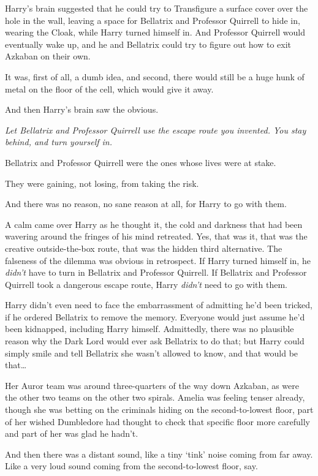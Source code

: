Harry’s brain suggested that he could try to Transfigure a surface cover over the hole in the wall, leaving a space for Bellatrix and Professor Quirrell to hide in, wearing the Cloak, while Harry turned himself in. And Professor Quirrell would eventually wake up, and he and Bellatrix could try to figure out how to exit Azkaban on their own.

It was, first of all, a dumb idea, and second, there would still be a huge hunk of metal on the floor of the cell, which would give it away.

And then Harry’s brain saw the obvious.

\emph{Let Bellatrix and Professor Quirrell use the escape route you invented. You stay behind, and turn yourself in.}

Bellatrix and Professor Quirrell were the ones whose lives were at stake.

They were gaining, not losing, from taking the risk.

And there was no reason, no sane reason at all, for Harry to go with them.

A calm came over Harry as he thought it, the cold and darkness that had been wavering around the fringes of his mind retreated. Yes, that was it, that was the creative outside-the-box route, that was the hidden third alternative. The falseness of the dilemma was obvious in retrospect. If Harry turned himself in, he \emph{didn’t} have to turn in Bellatrix and Professor Quirrell. If Bellatrix and Professor Quirrell took a dangerous escape route, Harry \emph{didn’t} need to go with them.

Harry didn’t even need to face the embarrassment of admitting he’d been tricked, if he ordered Bellatrix to remove the memory. Everyone would just assume he’d been kidnapped, including Harry himself. Admittedly, there was no plausible reason why the Dark Lord would ever ask Bellatrix to do that; but Harry could simply smile and tell Bellatrix she wasn’t allowed to know, and that would be that…

\later

Her Auror team was around three-quarters of the way down Azkaban, as were the other two teams on the other two spirals. Amelia was feeling tenser already, though she was betting on the criminals hiding on the second-to-lowest floor, part of her wished Dumbledore had thought to check that specific floor more carefully and part of her was glad he hadn’t.

And then there was a distant sound, like a tiny ‘tink’ noise coming from far away. Like a very loud sound coming from the second-to-lowest floor, say.

